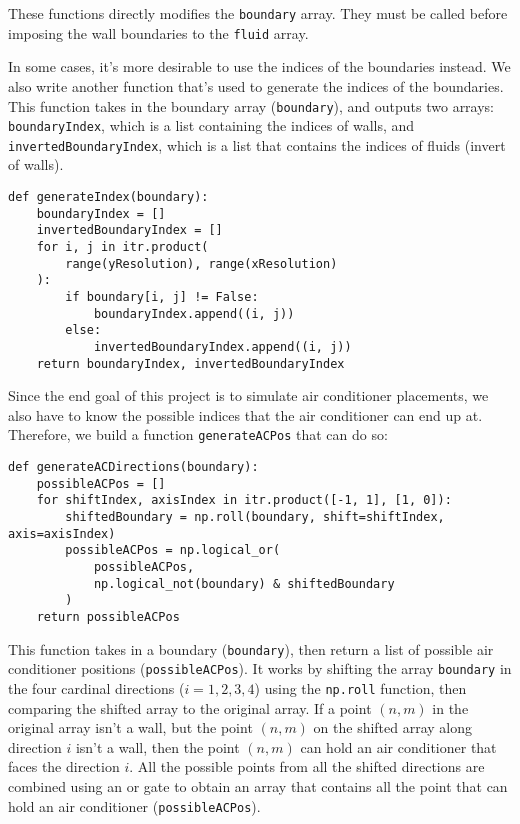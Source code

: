 These functions directly modifies the \texttt{boundary} array. They must be called before imposing the wall boundaries to the \texttt{fluid} array.

In some cases, it's more desirable to use the indices of the boundaries instead. We also write another function that's used to generate the indices of the boundaries. This function takes in the boundary array (\texttt{boundary}), and outputs two arrays: \texttt{boundaryIndex}, which is a list containing the indices of walls, and \texttt{invertedBoundaryIndex}, which is a list that contains the indices of fluids (invert of walls).
\begin{verbatim}
def generateIndex(boundary):
    boundaryIndex = []
    invertedBoundaryIndex = []
    for i, j in itr.product(
        range(yResolution), range(xResolution)
    ):
        if boundary[i, j] != False:
            boundaryIndex.append((i, j))
        else:
            invertedBoundaryIndex.append((i, j))
    return boundaryIndex, invertedBoundaryIndex
\end{verbatim}

Since the end goal of this project is to simulate air conditioner placements, we also have to know the possible indices that the air conditioner can end up at. Therefore, we build a function \texttt{generateACPos} that can do so:
\begin{verbatim}
def generateACDirections(boundary):
    possibleACPos = []
    for shiftIndex, axisIndex in itr.product([-1, 1], [1, 0]):
        shiftedBoundary = np.roll(boundary, shift=shiftIndex, axis=axisIndex)
        possibleACPos = np.logical_or(
            possibleACPos,
            np.logical_not(boundary) & shiftedBoundary
        )
    return possibleACPos
\end{verbatim}
This function takes in a boundary (\texttt{boundary}), then return a list of possible air conditioner positions (\texttt{possibleACPos}). It works by shifting the array \texttt{boundary} in the four cardinal directions ($i = 1, 2, 3, 4$) using the \texttt{np.roll} function, then comparing the shifted array to the original array. If a point $(n, m)$ in the original array isn't a wall, but the point $(n, m)$ on the shifted array along direction $i$ isn't a wall, then the point $(n, m)$ can hold an air conditioner that faces the direction $i$. All the possible points from all the shifted directions are combined using an or gate to obtain an array that contains all the point that can hold an air conditioner (\texttt{possibleACPos}).

